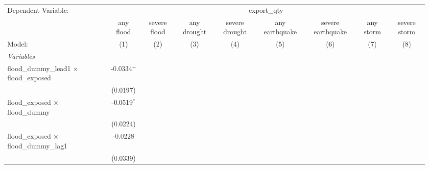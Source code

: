 
\begingroup
\centering
\begin{tabular}{lcccccccc}
   \tabularnewline \midrule \midrule
   Dependent Variable: & \multicolumn{8}{c}{export\_qty}\\
                                                                      & any flood             & severe flood          & any drought           & severe drought        & any earthquake        & severe earthquake     & any storm             & severe storm \\   
   Model:                                                             & (1)                   & (2)                   & (3)                   & (4)                   & (5)                   & (6)                   & (7)                   & (8)\\  
   \midrule
   \emph{Variables}\\
   flood\_dummy\_lead1 $\times$ flood\_exposed                        & -0.0334$^{+}$         &                       &                       &                       &                       &                       &                       &   \\   
                                                                      & (0.0197)              &                       &                       &                       &                       &                       &                       &   \\   
   flood\_exposed $\times$ flood\_dummy                               & -0.0519$^{*}$         &                       &                       &                       &                       &                       &                       &   \\   
                                                                      & (0.0224)              &                       &                       &                       &                       &                       &                       &   \\   
   flood\_exposed $\times$ flood\_dummy\_lag1                         & -0.0228               &                       &                       &                       &                       &                       &                       &   \\   
                                                                      & (0.0339)              &                       &                       &                       &                       &                       &                       &   \\   

\end{tabular}

